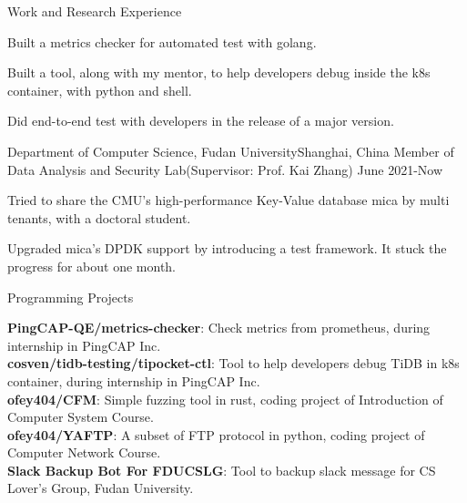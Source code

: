 \documentclass{resume} %
\begin{document}
\begin{rSection}{Work and Research Experience}
\begin{rSubsection}
\item Built a metrics checker for automated test with golang.

\item Built a tool, along with my mentor, to help developers debug inside the k8s container, with python and shell.

\item Did end-to-end test with developers in the release of a major version.


\end{rSubsection}


\begin{rSubsection}
{Department of Computer Science, Fudan University}{Shanghai, China}
{Member of Data Analysis and Security Lab(Supervisor: Prof. Kai Zhang)} {June 2021-Now}

\item Tried to share the CMU's high-performance Key-Value database mica by multi tenants, with a doctoral student.
\item Upgraded mica's DPDK support by introducing a test framework. It stuck the progress for about one month.

\end{rSubsection}

\end{rSection}


\begin{rSection}{Programming Projects}

{\bf PingCAP-QE/metrics-checker}: Check metrics from prometheus, during internship in PingCAP Inc.
\\ {\bf cosven/tidb-testing/tipocket-ctl}: Tool to help developers debug TiDB in k8s container, during internship in PingCAP Inc. 
\\ {\bf ofey404/CFM}: Simple fuzzing tool in rust, coding project of Introduction of Computer System Course.
\\ {\bf ofey404/YAFTP}: A subset of FTP protocol in python, coding project of Computer Network Course.
\\ {\bf Slack Backup Bot For FDUCSLG}: Tool to backup slack message for CS Lover's Group, Fudan University.

\end{rSection}
\end{document}
